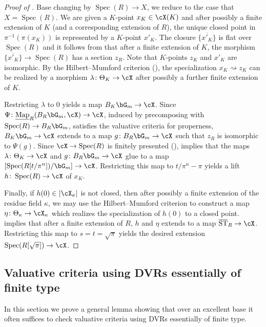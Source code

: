 \documentclass[a4paper]{amsart}
\numberwithin{equation}{section}
\theoremstyle{plain}
\theoremstyle{definition}
\DeclareMathOperator{\Spec}{Spec}
\DeclareMathOperator{\ST}{ST}
\newcommand{\co}{\colon}
\DeclareMathOperator{\Map}{Map}
\def\oST{\overline{\ST}}
\begin{document}
\begin{proof}[Proof of ]
Base changing by $\Spec(R) \to X$, we reduce to the case that $X=\Spec(R)$.  We are given a $K$-point $x_K \in \cX(K)$ and after possibly a finite extension of $K$ (and a corresponding extension of $R$), the unique closed point in $\pi^{-1}(\pi(x_K))$ is represented by a $K$-point $x'_K$.  The closure $\overline{ \{x'_K\}}$ is flat over $\Spec(R)$ and it follows from \cite[IV.17.16.2]{EGA} that after a finite extension of $K$,  the morphism $\overline{ \{x'_K\}} \to \Spec(R)$ has a section $z_R$.
Note that $K$-points $z_K$  and $x'_K$ are isomorphic.  By the Hilbert--Mumford criterion (), the specialization $x_K \rightsquigarrow z_K$ can be realized by a morphism $\lambda \co \Theta_K \to \cX$ after possibly a further finite extension of $K$.

Restricting $\lambda$ to $0$ yields a map $B_K \bG_m \to \cX$.    Since $\Psi \co \underline{\Map}_R(B_R \bG_m, \cX) \to \cX$, induced by precomposing with $\Spec(R) \to B_R \bG_m$, satisfies the valuative criteria for properness, $B_K \bG_m \to \cX$ extends to a map $g \co B_R \bG_m \to \cX$ such that $z_R$ is isomorphic to $\Psi(g)$.  Since $\cX \to \Spec(R)$ is finitely presented (\cite[Thm.~A.1]{ahr}),  implies that the maps $\lambda \co \Theta_K \to \cX$ and $g \co B_R \bG_m \to \cX$ glue  to  a map  $[\Spec(R[t/\pi^n])/\bG_m] \to \cX$.  Restricting this map to $t/\pi^n-\pi$ yields a lift $h \co \Spec(R) \to \cX$ of $x_K$.

Finally, if $h(0) \in |\cX_{\kappa}|$ is not closed, then after possibly a finite extension of the residue field $\kappa$, 
we may use the Hilbert--Mumford criterion to construct a map $\eta \co \Theta_{\kappa} \to \cX_{\kappa}$ which realizes the specialization of $h(0)$ to a closed point.   implies that after a finite extension of $R$, $h$ and $\eta$ extends to a map $\oST_{R} \to \cX$.  Restricting this map to $s=t=\sqrt{\pi}$ yields the desired extension $\Spec(R[\sqrt{\pi}])  \to \cX$.
\end{proof}

\subsection{Valuative criteria using DVRs essentially of finite type}

In this section we prove a general lemma showing that over an excellent base it often suffices to check valuative criteria using DVRs essentially of finite type. 
\end{document}

